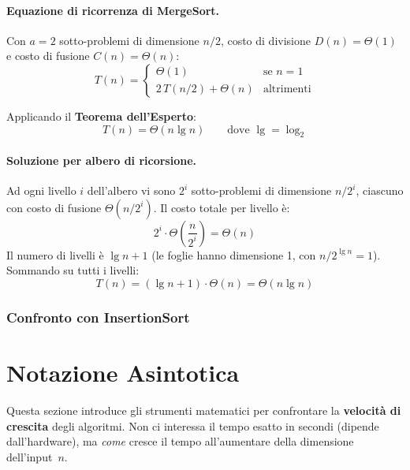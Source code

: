 \documentclass[a4paper, 11pt]{article}
\theoremstyle{definition}
\theoremstyle{remark}
\theoremstyle{remark}
\newenvironment{nota}{%
	\begin{tcolorbox}[
		colback=codebg,
		colframe=primary,
		fonttitle=\bfseries,
		title=Nota,
		left=6pt, right=6pt, top=4pt, bottom=4pt
		]
	}{%
	\end{tcolorbox}
}
\begin{document}
	\paragraph{Equazione di ricorrenza di MergeSort.}
	
	Con $a = 2$ sotto-problemi di dimensione $n/2$, costo di divisione
	$D(n) = \Theta(1)$ e costo di fusione $C(n) = \Theta(n)$:
	\[
	T(n) = \begin{cases}
		\Theta(1)                & \text{se } n = 1           \\[4pt]
		2\,T(n/2) + \Theta(n)   & \text{altrimenti}
	\end{cases}
	\]
	
	Applicando il \textbf{Teorema dell'Esperto}:
	\[
	\boxed{T(n) = \Theta(n \lg n)} \qquad \text{dove } \lg = \log_2
	\]
	
	\paragraph{Soluzione per albero di ricorsione.}
	
\begin{center}
		\begin{nota}
		Ad ogni livello $i$ dell'albero vi sono $2^i$ sotto-problemi di
		dimensione $n/2^i$, ciascuno con costo di fusione $\Theta(n/2^i)$.
		Il costo totale per livello è:
		\[
		2^i \cdot \Theta\!\left(\frac{n}{2^i}\right) = \Theta(n)
		\]
		Il numero di livelli è $\lg n + 1$ (le foglie hanno dimensione 1,
		con $n/2^{\lg n} = 1$). Sommando su tutti i livelli:
		\[
		T(n) = (\lg n + 1) \cdot \Theta(n) = \Theta(n \lg n)
		\]
	\end{nota}
\end{center}
	
	\subsubsection{Confronto con InsertionSort}
	
	\section{Notazione Asintotica}
	
	\begin{softnote}
		Questa sezione introduce gli strumenti matematici per confrontare
		la \textbf{velocità di crescita} degli algoritmi. Non ci interessa
		il tempo esatto in secondi (dipende dall'hardware), ma \textit{come}
		cresce il tempo all'aumentare della dimensione dell'input~$n$.
	\end{softnote}
	
\end{document}
